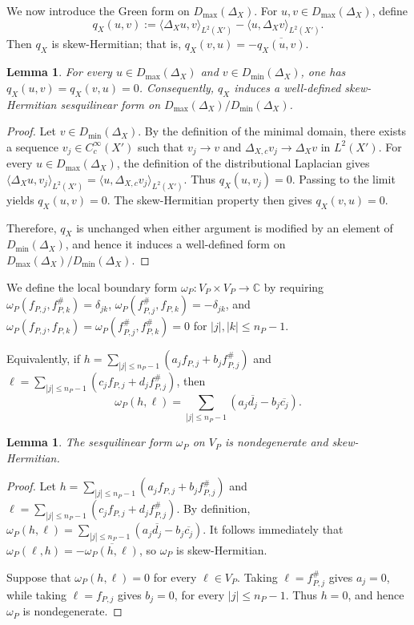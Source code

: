 \documentclass[12pt]{amsart}
\theoremstyle{plain}
\newtheorem{lem}[thm]{Lemma}
\theoremstyle{definition}
\theoremstyle{remark}
\numberwithin{equation}{section} \numberwithin{figure}{section}
\renewcommand*{\to}{\rightarrow}
\begin{document}
We now introduce the Green form on \(D_{\max}(\Delta_X)\). For
\(u,v\in D_{\max}(\Delta_X)\), define
\[
q_X(u,v)
:=
\langle\Delta_Xu,v\rangle_{L^2(X')}
-
\langle u,\Delta_Xv\rangle_{L^2(X')}.
\]
Then \(q_X\) is
skew-Hermitian; that is,
\(q_X(v,u)=-\overline{q_X(u,v)}\).



\begin{lem}\label{lem:dmin-kernel}
For every \(u\in D_{\max}(\Delta_X)\) and
\(v\in D_{\min}(\Delta_X)\), one has
\(q_X(u,v)=q_X(v,u)=0\). Consequently, \(q_X\) induces a well-defined
skew-Hermitian sesquilinear form on
\(D_{\max}(\Delta_X)/D_{\min}(\Delta_X)\).
\end{lem}

\begin{proof}
Let \(v\in D_{\min}(\Delta_X)\). By the definition of the minimal
domain, there exists a sequence \(v_j\in C_c^\infty(X')\) such that
\(v_j\to v\) and
\(\Delta_{X,c}v_j\to\Delta_Xv\) in \(L^2(X')\). For every
\(u\in D_{\max}(\Delta_X)\), the definition of the distributional
Laplacian gives
\(\langle\Delta_Xu,v_j\rangle_{L^2(X')}
=\langle u,\Delta_{X,c}v_j\rangle_{L^2(X')}\). Thus
\(q_X(u,v_j)=0\). Passing to the limit yields \(q_X(u,v)=0\).
The skew-Hermitian property then gives \(q_X(v,u)=0\).

Therefore, \(q_X\) is unchanged when either argument is modified by an
element of \(D_{\min}(\Delta_X)\), and hence it induces a
well-defined form on
\(D_{\max}(\Delta_X)/D_{\min}(\Delta_X)\).
\end{proof}

We define the local boundary form
\(\omega_P:V_P\times V_P\to\mathbb C\) by requiring
\(\omega_P(f_{P,j},f_{P,k}^{\#})=\delta_{jk}\),
\(\omega_P(f_{P,j}^{\#},f_{P,k})=-\delta_{jk}\), and
\(\omega_P(f_{P,j},f_{P,k})
=\omega_P(f_{P,j}^{\#},f_{P,k}^{\#})=0\) for
\(|j|,|k|\leq n_P-1\).

Equivalently, if
\(h=\sum_{|j|\leq n_P-1}
(a_jf_{P,j}+b_jf_{P,j}^{\#})\) and
\(\ell=\sum_{|j|\leq n_P-1}
(c_jf_{P,j}+d_jf_{P,j}^{\#})\), then
\[
\omega_P(h,\ell)
=
\sum_{|j|\leq n_P-1}
\left(
a_j\overline{d_j}-b_j\overline{c_j}
\right).
\]

\begin{lem}\label{lem:omega-p-nondegenerate}
The sesquilinear form \(\omega_P\) on \(V_P\) is nondegenerate and
skew-Hermitian.
\end{lem}

\begin{proof}
Let
\(h=\sum_{|j|\leq n_P-1}
(a_jf_{P,j}+b_jf_{P,j}^{\#})\) and
\(\ell=\sum_{|j|\leq n_P-1}
(c_jf_{P,j}+d_jf_{P,j}^{\#})\). By definition,
\(\omega_P(h,\ell)
=\sum_{|j|\leq n_P-1}
(a_j\overline{d_j}-b_j\overline{c_j})\). It follows immediately that
\(\omega_P(\ell,h)=-\overline{\omega_P(h,\ell)}\), so \(\omega_P\) is
skew-Hermitian.

Suppose that \(\omega_P(h,\ell)=0\) for every \(\ell\in V_P\). Taking
\(\ell=f_{P,j}^{\#}\) gives \(a_j=0\), while taking
\(\ell=f_{P,j}\) gives \(b_j=0\), for every
\(|j|\leq n_P-1\). Thus \(h=0\), and hence \(\omega_P\) is
nondegenerate.
\end{proof}
\end{document}
